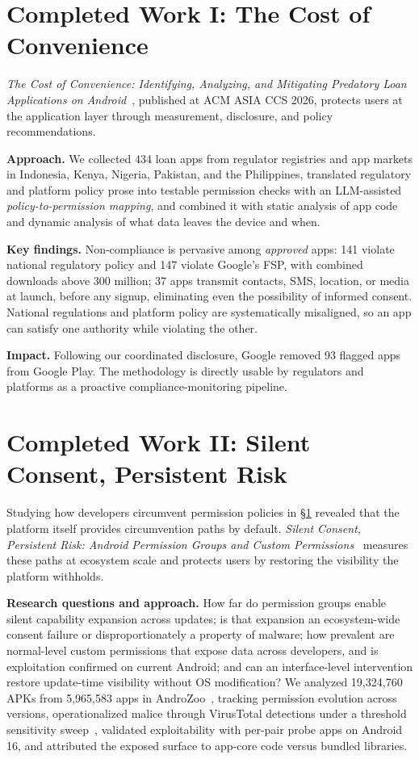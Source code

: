 \documentclass[letterpaper,11pt]{article}
\begin{document}
\section{Completed Work I: The Cost of Convenience}
\label{sec:loanapps}

\emph{The Cost of Convenience: Identifying, Analyzing, and Mitigating
Predatory Loan Applications on Android}~\cite{akanji2026cost},
published at ACM ASIA CCS 2026, protects users at the application
layer through measurement, disclosure, and policy recommendations.

\textbf{Approach.} We collected 434 loan apps from regulator registries
and app markets in Indonesia, Kenya, Nigeria, Pakistan, and the
Philippines, translated regulatory and platform policy prose into
testable permission checks with an LLM-assisted
\emph{policy-to-permission mapping}, and combined it with static
analysis of app code and dynamic analysis of what data leaves the
device and when.

\textbf{Key findings.} Non-compliance is pervasive among
\emph{approved} apps: 141 violate national regulatory policy and 147
violate Google's FSP, with combined downloads above 300 million; 37 apps
transmit contacts, SMS, location, or media at launch, before any signup,
eliminating even the possibility of informed consent. National
regulations and platform policy are systematically misaligned, so an
app can satisfy one authority while violating the other.

\textbf{Impact.} Following our coordinated disclosure, Google removed
93 flagged apps from Google Play. The methodology is directly usable
by regulators and platforms as a proactive compliance-monitoring
pipeline.

\section{Completed Work II: Silent Consent, Persistent Risk}
\label{sec:silentconsent}

Studying how developers circumvent permission policies in
\S\ref{sec:loanapps} revealed that the platform itself provides
circumvention paths by default. \emph{Silent Consent, Persistent Risk:
Android Permission Groups and Custom
Permissions}~\cite{akanji2026silent} measures these paths at ecosystem
scale and protects users by restoring the visibility the platform
withholds.

\textbf{Research questions and approach.} How far do permission groups
enable silent capability expansion across updates; is that expansion an
ecosystem-wide consent failure or disproportionately a property of
malware; how prevalent are normal-level custom permissions that expose
data across developers, and is exploitation confirmed on current
Android; and can an interface-level intervention restore update-time
visibility without OS modification? We analyzed 19,324,760 APKs from
5,965,583 apps in AndroZoo~\cite{allix2016androzoo}, tracking
permission evolution across versions, operationalized malice through
VirusTotal detections under a threshold sensitivity
sweep~\cite{zhu2020vt}, validated exploitability with per-pair probe
apps on Android 16, and attributed the exposed surface to app-core code
versus bundled libraries.
\end{document}
